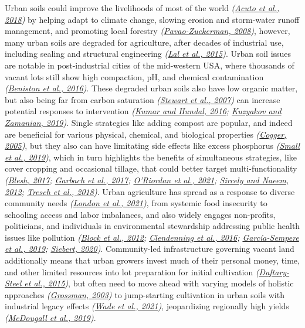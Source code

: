 \documentclass[
  12pt,
]{article}
\begin{document}
Urban soils could improve the livelihoods of most of the world \emph{(\protect\hyperlink{ref-acuto18}{Acuto et al., 2018})} by helping adapt to climate change, slowing erosion and storm-water runoff management, and promoting local forestry \emph{(\protect\hyperlink{ref-pavao-zuckerman08}{Pavao-Zuckerman, 2008})}, however, many urban soils are degraded for agriculture, after decades of industrial use, including sealing and structural engineering \emph{(\protect\hyperlink{ref-lal15}{Lal et al., 2015})}.
Urban soil issues are notable in post-industrial cities of the mid-western USA, where thousands of vacant lots still show high compaction, pH, and chemical contamination \emph{(\protect\hyperlink{ref-beniston16}{Beniston et al., 2016})}.
These degraded urban soils also have low organic matter, but also being far from carbon saturation \emph{(\protect\hyperlink{ref-stewart07}{Stewart et al., 2007})} can increase potential responses to intervention \emph{(\protect\hyperlink{ref-kumar16}{Kumar and Hundal, 2016}; \protect\hyperlink{ref-kuzyakov19}{Kuzyakov and Zamanian, 2019})}.
Single strategies like adding compost are popular, and indeed are beneficial for various physical, chemical, and biological properties \emph{(\protect\hyperlink{ref-cogger05}{Cogger, 2005})}, but they also can have limitating side effects like excess phosphorus \emph{(\protect\hyperlink{ref-small19}{Small et al., 2019})}, which in turn highlights the benefits of simultaneous strategies, like cover cropping and occasional tillage, that could better target multi-functionality \emph{(\protect\hyperlink{ref-blesh17}{Blesh, 2017}; \protect\hyperlink{ref-garbach17}{Garbach et al., 2017}; \protect\hyperlink{ref-oriordan21}{O'Riordan et al., 2021}; \protect\hyperlink{ref-sircely12}{Sircely and Naeem, 2012}; \protect\hyperlink{ref-tresch18}{Tresch et al., 2018})}.
Urban agriculture has spread as a response to diverse community needs \emph{(\protect\hyperlink{ref-london21}{London et al., 2021})}, from systemic food insecurity to schooling access and labor imbalances, and also widely engages non-profits, politicians, and individuals in environmental stewardship addressing public health issues like pollution \emph{(\protect\hyperlink{ref-block12}{Block et al., 2012}; \protect\hyperlink{ref-clendenning16}{Clendenning et al., 2016}; \protect\hyperlink{ref-garcia-sempere19}{García-Sempere et al., 2019}; \protect\hyperlink{ref-siebert20}{Siebert, 2020})}.
Community-led infrastructure governing vacant land additionally means that urban growers invest much of their personal money, time, and other limited resources into lot preparation for initial cultivation \emph{(\protect\hyperlink{ref-daftary-steel15}{Daftary-Steel et al., 2015})},
but often need to move ahead with varying models of holistic approaches \emph{(\protect\hyperlink{ref-grossman03}{Grossman, 2003})} to jump-starting cultivation in urban soils with industrial legacy effects \emph{(\protect\hyperlink{ref-wade21}{Wade et al., 2021})}, jeopardizing regionally high yields \emph{(\protect\hyperlink{ref-mcdougall19}{McDougall et al., 2019})}.
\end{document}
